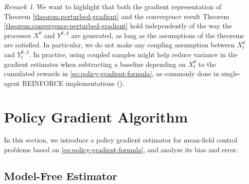 \documentclass[11pt]{article}
\numberwithin{equation}{section}
\theoremstyle{definition}
\theoremstyle{remark}
\newtheorem{remark}{Remark}[section]
\newcommand{\citet}{\cite}
\begin{document}
\begin{remark}
    We want to highlight that both the gradient representation of Theorem \ref{theorem:perturbed-gradient} and the convergence result Theorem \ref{theorem:convergence-perturbed-gradient} 
    hold independently of the way the processes $X^\theta$ and $Y^{\theta, \Lambda}$ are generated, as long as the assumptions of the theorems are satisfied.
     In particular, we do not make any coupling assumption between $X_t^\theta$ and $Y_t^{\theta, \Lambda}$.
     In practice, using coupled samples might help reduce variance in the gradient estimates when subtracting a baseline depending on $X_t^\theta$ to the cumulated rewards in \eqref{eq:policy-gradient-formula},
     as commonly done in single-agent REINFORCE implementations (\citet{williams1992simple, Sutton1998}).
\end{remark}

\section{Policy Gradient Algorithm}
\label{section:pg-algorithm}

In this section, we introduce a policy gradient estimator for mean-field control problems based on \eqref{eq:policy-gradient-formula}, and analyze its bias and error.

\subsection{Model-Free Estimator}
\label{subsection:model-free-estimator}
\end{document}
